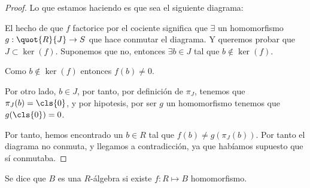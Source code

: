 \begin{proof}
	Lo que estamos haciendo es que sea el siguiente diagrama:

\begin{center}
\end{center}

El hecho de que $f$ factorice por el cociente significa que $\exists$ un homomorfismo $g: \quot{R}{J}\rightarrow S$ que hace conmutar el diagrama. Y queremos probar que $J \subset \ker (f)$. Suponemos que no, entonces $\exists b \in J$ tal que $b \notin \ker (f)$.

Como $b \notin \ker (f)$ entonces $f(b) \neq 0$.

Por otro lado, $b \in J$, por tanto, por definición de $\pi_J$, tenemos que $\pi_J(b)=\cls{0}$, y por hipotesis, por ser $g$ un homomorfismo tenemos que $g(\cls{0})=0$.

Por tanto, hemos encontrado un $b \in R$ tal que $f(b)\neq g(\pi_J(b))$. Por tanto el diagrama no conmuta, y llegamos a contradicción, ya que habíamos supuesto que sí conmutaba.
\end{proof}

\begin{defn}[R-álgebra]\label{def:ralgebra}
	Se dice que $B$ es una $R$-álgebra si existe $f:R\longmapsto B$ homomorfismo.
\end{defn}

